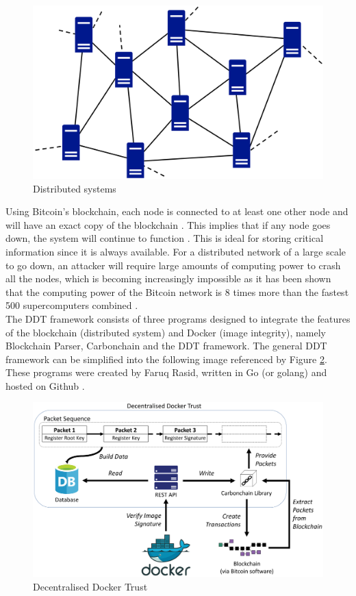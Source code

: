 \documentclass[a4paper,12pt]{article}
\begin{document}
{\begin{figure}[H]
	\centering
	\includegraphics[width=0.7\linewidth]{decentralised}
	\caption{Distributed systems}
	\label{fig:decentralised}
\end{figure}
\noindent
	Using Bitcoin's blockchain, each node is connected to at least one other node and will have an exact copy of the blockchain \cite{blockchaindup}. This implies that if any node goes down, the system will continue to function \cite{decentralised}. This is ideal for storing critical information since it is always available. For a distributed network of a large scale to go down, an attacker will require large amounts of computing power to crash all the nodes, which is becoming increasingly impossible as it has been shown that the computing power of the Bitcoin network is 8 times more than the fastest 500 supercomputers combined \cite{compower}.\\\newline
	The \ac{DDT} framework consists of three programs designed to integrate the features of the blockchain (distributed system) and Docker (image integrity), namely Blockchain Parser, Carbonchain and the \ac{DDT} framework. The general \ac{DDT} framework can be simplified into the following image referenced by Figure \ref{fig:ddt}. These programs were created by Faruq Rasid, written in Go (or golang) and hosted on Github \cite{githubblockchain}.
	
		\begin{figure}[H]
		\centering
		\includegraphics[width=1\linewidth]{DDT.eps}
		\caption{Decentralised Docker Trust}
		\label{fig:ddt}
	\end{figure}
	
}
\end{document}
